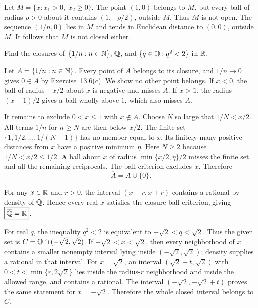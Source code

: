 Let $M=\{x:x_1>0,\ x_2\ge0\}$. The point $(1,0)$ belongs
to $M$, but every ball of radius $\rho>0$ about it contains
$(1,-\rho/2)$, outside $M$. Thus $M$ is not open.
The sequence $(1/n,0)$ lies in $M$ and tends in Euclidean
distance to $(0,0)$, outside $M$. It follows that $M$ is not
closed either.

\goal Find the closures of
$\{1/n:n\in\mathbb{N}\}$, $\mathbb{Q}$, and $\{q\in\mathbb{Q}:q^2<2\}$ in $\mathbb{R}$.

Let $A=\{1/n:n\in\mathbb{N}\}$. Every point of $A$ belongs to its
closure, and $1/n\to0$ gives $0\in\overline A$ by
Exercise~13.6(c). We show no other point belongs.
If $x<0$, the ball of radius $-x/2$ about $x$ is negative
and misses $A$. If $x>1$, the radius $(x-1)/2$ gives a
ball wholly above $1$, which also misses $A$.

It remains to exclude $0<x\le1$ with $x\notin A$.
Choose $N$ so large that $1/N<x/2$. All terms $1/n$ for
$n\ge N$ are then below $x/2$. The finite set
$\{1,1/2,\ldots,1/(N-1)\}$ has no member equal to $x$.
Its finitely many positive distances from $x$ have a positive
minimum $\eta$. Here $N\ge2$ because $1/N<x/2\le1/2$.
A ball about $x$ of radius $\min\{x/2,\eta\}/2$
misses the finite set and all the remaining reciprocals.
The ball criterion excludes $x$. Therefore
\[
 \boxed{\overline A=A\cup\{0\}.}
\]

For any $x\in\mathbb{R}$ and $r>0$, the interval $(x-r,x+r)$
contains a rational by density of $\mathbb{Q}$. Hence every real $x$
satisfies the closure ball criterion, giving
$\boxed{\overline{\mathbb{Q}}=\mathbb{R}}$.

For real $q$, the inequality $q^2<2$ is equivalent to
$-\sqrt2<q<\sqrt2$. Thus the given set is
$C=\mathbb{Q}\cap(-\sqrt2,\sqrt2)$.
If $-\sqrt2<x<\sqrt2$, then every neighborhood of $x$
contains a smaller nonempty interval lying inside
$(-\sqrt2,\sqrt2)$; density supplies a rational in that interval.
For $x=\sqrt2$, an interval
$(\sqrt2-t,\sqrt2)$ with $0<t<\min\{r,2\sqrt2\}$
lies inside the radius-$r$ neighborhood and inside the allowed
range, and contains a rational. The interval
$(-\sqrt2,-\sqrt2+t)$ proves the same statement for $x=-\sqrt2$.
Therefore the whole closed interval belongs to $\overline C$.

